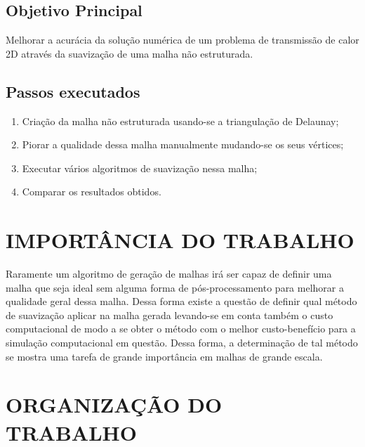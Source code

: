 \subsection{Objetivo Principal}

Melhorar a acurácia da solução numérica de um problema de transmissão de calor 2D através da suavização de uma malha não estruturada.

\subsection*{Passos executados}

\begin{enumerate}
    \item Criação da malha não estruturada usando-se a triangulação de Delaunay;
    \item Piorar a qualidade dessa malha manualmente mudando-se os seus vértices;
    \item Executar vários algoritmos de suavização nessa malha;
    \item Comparar os resultados obtidos.
\end{enumerate}


\section{IMPORTÂNCIA DO TRABALHO}

Raramente um algoritmo de geração de malhas irá ser capaz de definir uma malha que seja ideal sem alguma forma de pós-processamento para melhorar a qualidade geral dessa malha. \cite{Salama} Dessa forma existe a questão de definir qual método de suavização aplicar na malha gerada levando-se em conta também o custo computacional de modo a se obter o método com o melhor custo-benefício para a simulação computacional em questão. Dessa forma, a determinação de tal método se mostra uma tarefa de grande importância em malhas de grande escala.

\section{ORGANIZAÇÃO DO TRABALHO}

